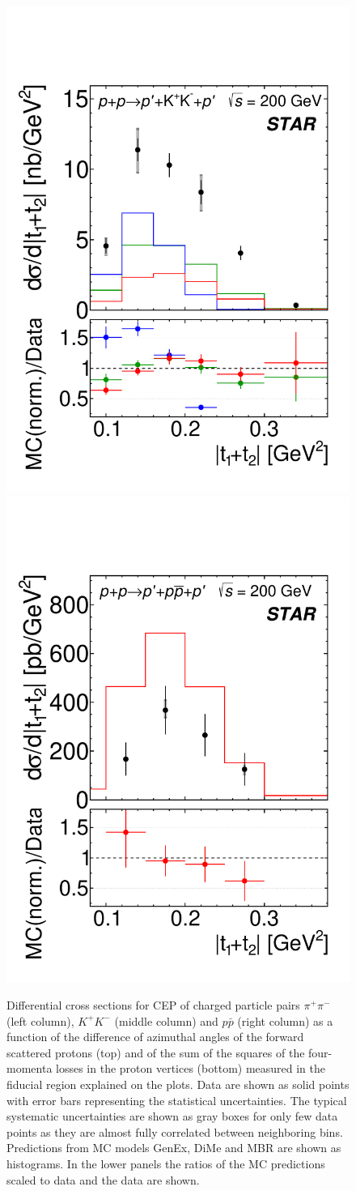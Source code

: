 \begin{figure}[h]
\hfill
\includegraphics[width=.31\textwidth,page=1]{graphics/physicsResults/Ratio_FinalResult_MandelstamTSum_kaon.pdf}
\hfill
\includegraphics[width=.31\textwidth,page=1]{graphics/physicsResults/Ratio_FinalResult_MandelstamTSum_proton.pdf}
%
\caption[Differential cross sections for CEP of charged particle pairs $\pi^+\pi^-$, $K^+K^-$ and $p\bar{p}$ as a function of the difference of azimuthal angles of the forward scattered protons and of the sum of the squares of the four-momenta losses in the proton vertices measured in the fiducial region.]{Differential cross sections for CEP of charged particle pairs $\pi^+\pi^-$ (left column), $K^+K^-$ (middle column) and $p\bar{p}$ (right column) as a function of the difference of azimuthal angles of the forward scattered protons (top) and of the sum of the squares of the four-momenta losses in the proton vertices (bottom) measured in the fiducial region explained on the plots. Data are shown as solid points with error bars representing the statistical uncertainties. The typical systematic uncertainties are shown as gray boxes for only few data points as they are almost fully correlated between neighboring bins. Predictions from MC models GenEx, DiMe and MBR are shown as histograms. In the lower panels the ratios of the MC predictions scaled to data and the data are shown.}
\label{results_2}
\end{figure}
%
